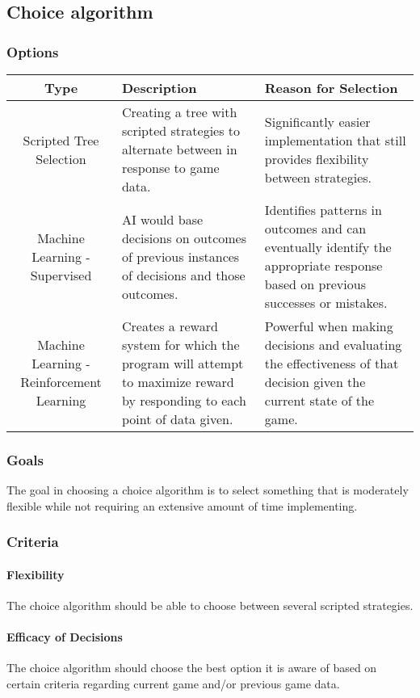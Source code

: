 \documentclass[10pt,letterpaper,onecolumn,draftclsnofoot]{IEEEtran}
\begin{document}
\subsection{Choice algorithm}
\subsubsection{Options}
\begin{center}
	\begin{tabular}{ ||C|L|L|| } 
		\hline
		Type & Description & Reason for Selection \\
		\hline
		Scripted Tree Selection & Creating a tree with scripted strategies to alternate between in response to game data. & Significantly easier implementation that still provides flexibility between strategies. \\ 
		\hline
		Machine Learning - Supervised & AI would base decisions on outcomes of previous instances of decisions and those outcomes. & Identifies patterns in outcomes and can eventually identify the appropriate response based on previous successes or mistakes. \\ 
		\hline
		Machine Learning - Reinforcement Learning & Creates a reward system for which the program will attempt to maximize reward by responding to each point of data given. & Powerful when making decisions and evaluating the effectiveness of that decision given the current state of the game. \\ 
		\hline
	\end{tabular}
\end{center}
\subsubsection{Goals}
The goal in choosing a choice algorithm is to select something that is moderately flexible while not requiring an extensive amount of time implementing.
\subsubsection{Criteria}
\paragraph{Flexibility}
The choice algorithm should be able to choose between several scripted strategies.
\paragraph{Efficacy of Decisions}
The choice algorithm should choose the best option it is aware of based on certain criteria regarding current game and/or previous game data.
\end{document}
